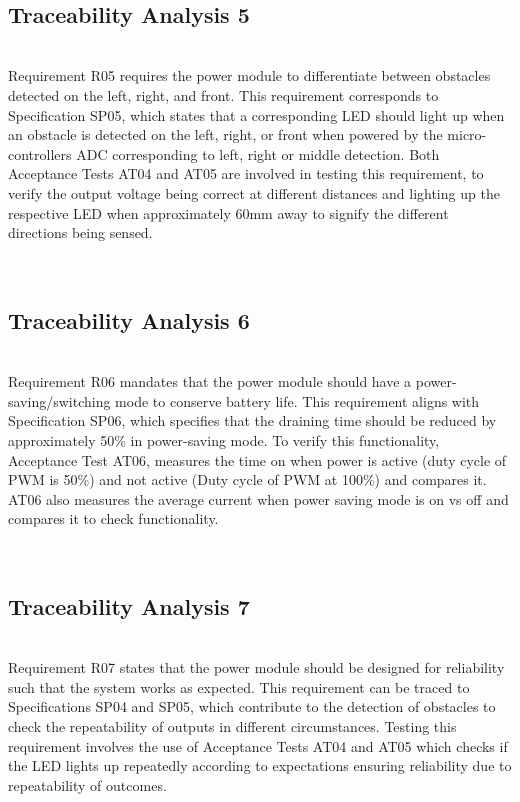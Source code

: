\documentclass[class=report,11pt,crop=false]{standalone}
\begin{document}
\\ \subsection{Traceability Analysis 5} \\
Requirement R05 requires the power module to differentiate between obstacles detected on the left, right, and front. This requirement corresponds to Specification SP05, which states that a corresponding LED should light up when an obstacle is detected on the left, right, or front when powered by the micro-controllers ADC corresponding to left, right or middle detection. Both Acceptance Tests AT04 and AT05 are involved in testing this requirement, to verify the output voltage being correct at different distances and lighting up the respective LED when approximately 60mm away to signify the different directions being sensed.

\\ \subsection{Traceability Analysis 6} \\
Requirement R06 mandates that the power module should have a power-saving/switching mode to conserve battery life. This requirement aligns with Specification SP06, which specifies that the draining time should be reduced by approximately 50\% in power-saving mode. To verify this functionality, Acceptance Test AT06, measures the time on when power is active (duty cycle of PWM is 50\%) and not active (Duty cycle of PWM at 100\%) and compares it. AT06 also measures the average current when power saving mode is on vs off and compares it to check functionality.

\\ \subsection{Traceability Analysis 7} \\
Requirement R07 states that the power module should be designed for reliability such that the system works as expected. This requirement can be traced to Specifications SP04 and SP05, which contribute to the detection of obstacles to check the repeatability of outputs in different circumstances. Testing this requirement involves the use of Acceptance Tests AT04 and AT05 which checks if the LED lights up repeatedly according to expectations ensuring reliability due to repeatability of outcomes.




\ifstandalone

\fi
\end{document}
